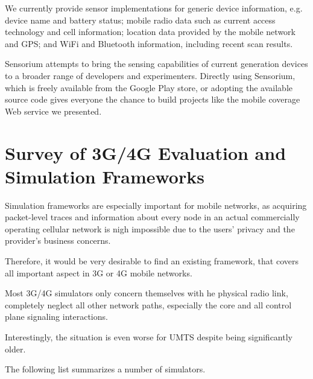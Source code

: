 We currently provide sensor implementations for generic device information, e.g. device name and battery status; mobile radio data such as current access technology and cell information; location data provided by the mobile network and \gls{GPS}; and  WiFi and Bluetooth information, including recent scan results.

Sensorium attempts to bring the sensing capabilities of current generation devices to a broader range of developers and experimenters. Directly using Sensorium, which is freely available from the Google Play store, or adopting the available source code gives everyone the chance to build projects like the mobile coverage Web service we presented.



\section{Survey of 3G/4G Evaluation and Simulation Frameworks}

Simulation frameworks are especially important for mobile networks, as acquiring packet-level traces and information about every node in an actual commercially operating cellular network is nigh impossible due to the users' privacy and the provider's business concerns.

Therefore, it would be very desirable to find an existing framework, that covers all important aspect in 3G or 4G mobile networks.

Most 3G/4G simulators only concern themselves with he physical radio link, completely neglect all other network paths, especially the core and all control plane signaling interactions.

Interestingly, the situation is even worse for \gls{UMTS} despite being significantly older.

The following list summarizes a number of simulators.

